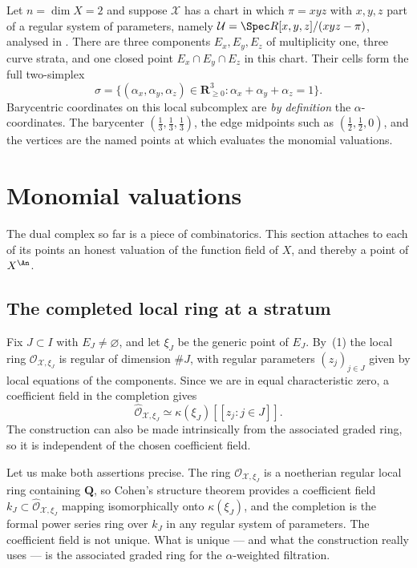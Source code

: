 \begin{example}
\label{ex:dual-complex-triangle}
Let $n=\dim X=2$ and suppose $\mathcal X$ has a chart in which
$\pi=xyz$ with $x,y,z$ part of a regular system of parameters, namely
$\mathcal U=\Spec R[x,y,z]/(xyz-\pi)$, analysed in
. There are three
components $E_x,E_y,E_z$ of multiplicity one, three curve strata, and one
closed point $E_x\cap E_y\cap E_z$ in this chart. Their cells form the
full two-simplex
\[
 \sigma=\{(\alpha_x,\alpha_y,\alpha_z)\in\mathbf R_{\geq0}^3:
          \alpha_x+\alpha_y+\alpha_z=1\}.
\]
Barycentric coordinates on this local subcomplex are \emph{by definition} the
$\alpha$-coordinates. The barycenter $(\tfrac13,\tfrac13,\tfrac13)$, the
edge midpoints such as $(\tfrac12,\tfrac12,0)$, and the vertices are the
named points at which  evaluates the
monomial valuations.
\end{example}

\section{Monomial valuations}
\label{sec:skeleton-monomial}

The dual complex so far is a piece of combinatorics. This section attaches
to each of its points an honest valuation of the function field of $X$,
and thereby a point of $X^{\An}$.

\subsection{The completed local ring at a stratum}

Fix $J\subset I$ with $E_J\neq\varnothing$, and let $\xi_J$ be the
generic point of $E_J$. By \,(1) the local ring
$\mathcal O_{\mathcal X,\xi_J}$ is regular of dimension $\#J$, with
regular parameters $(z_j)_{j\in J}$ given by local equations of the
components. Since we are in equal characteristic zero, a coefficient
field in the completion gives
\[
 \widehat{\mathcal O}_{\mathcal X,\xi_J}
       \simeq\kappa(\xi_J)[[z_j:j\in J]].
\]
The construction can also be made intrinsically from the associated graded
ring, so it is independent of the chosen coefficient field.

Let us make both assertions precise. The ring
$\mathcal O_{\mathcal X,\xi_J}$ is a noetherian regular local ring
containing $\mathbf Q$, so Cohen's structure theorem provides a
coefficient field $k_J\subset\widehat{\mathcal O}_{\mathcal X,\xi_J}$
mapping isomorphically onto $\kappa(\xi_J)$, and the completion is the
formal power series ring over $k_J$ in any regular system of parameters.
The coefficient field is not unique. What is unique --- and what the
construction really uses --- is the associated graded ring for the
$\alpha$-weighted filtration.

